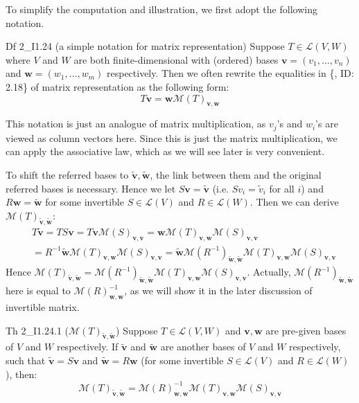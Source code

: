 \documentclass{article}
\newcommand{\basisTilde}[1]{\tilde{\pmb{#1}}}
\begin{document}
To simplify the computation and illustration, we first adopt the following notation.
\begin{Df}{Df 2\_I1.24 (a simple notation for matrix representation)}
    Suppose $T\in\mathcal{L}(V, W)$ where $V$ and $W$ are both finite-dimensional with (ordered) bases $\pmb{v} = (v_1, \dots, v_n)$ and $\pmb{w} = (w_1, \dots, w_m)$ respectively. Then we often rewrite the equalities in \{, ID: 2.18\} of matrix representation as the following form:
    $$ T\pmb{v} = \pmb{w}\mathcal{M}(T)_{\pmb{v}, \pmb{w}} $$
\end{Df}
This notation is just an analogue of matrix multiplication, as $v_j$'s and $w_i$'s are viewed as column vectors here. Since this is just the matrix multiplication, we can apply the associative law, which as we will see later is very convenient.

To shift the referred bases to $\basisTilde{v}, \basisTilde{w}$, the link between them and the original referred bases is necessary. Hence we let $S\pmb{v} = \basisTilde{v}$ \textcolor{Df}{(i.e. $Sv_i = \tilde{v}_i$ for all $i$)} and $R\pmb{w} = \basisTilde{w}$ for some invertible $S\in\mathcal{L}(V)$ and $R\in\mathcal{L}(W)$. Then we can derive $\mathcal{M}(T)_{\basisTilde{v}, \basisTilde{w}}$:
$$
\begin{aligned}
    & T\basisTilde{v} = TS\pmb{v} = T\pmb{v}\mathcal{M}(S)_{\pmb{v}, \pmb{v}} = \pmb{w}\mathcal{M}(T)_{\pmb{v}, \pmb{w}}\mathcal{M}(S)_{\pmb{v}, \pmb{v}} \\
    &= R^{-1}\basisTilde{w}\mathcal{M}(T)_{\pmb{v}, \pmb{w}}\mathcal{M}(S)_{\pmb{v}, \pmb{v}} = \basisTilde{w}\mathcal{M}(R^{-1})_{\basisTilde{w}, \basisTilde{w}}\mathcal{M}(T)_{\pmb{v}, \pmb{w}}\mathcal{M}(S)_{\pmb{v}, \pmb{v}}
\end{aligned}
$$
Hence $\mathcal{M}(T)_{\basisTilde{v}, \basisTilde{w}} = \mathcal{M}(R^{-1})_{\basisTilde{w}, \basisTilde{w}}\mathcal{M}(T)_{\pmb{v}, \pmb{w}}\mathcal{M}(S)_{\pmb{v}, \pmb{v}}$. Actually, $\mathcal{M}(R^{-1})_{\basisTilde{w}, \basisTilde{w}}$ here is equal to $\mathcal{M}(R)^{-1}_{\pmb{w}, \pmb{w}}$, as we will show it in the later discussion of invertible matrix.

\begin{Th}{Th 2\_I1.24.1 ($\mathcal{M}(T)_{\basisTilde{v}, \basisTilde{w}}$)}
    Suppose $T\in\mathcal{L}(V,W)$ and $\pmb{v}, \pmb{w}$ are pre-given bases of $V$ and $W$ respectively. If $\basisTilde{v}$ and $\basisTilde{w}$ are another bases of $V$ and $W$ respectively, such that $\basisTilde{v} = S\pmb{v}$ and $\basisTilde{w} = R\pmb{w}$ (for some invertible $S\in\mathcal{L}(V)$ and $R\in\mathcal{L}(W)$), then:
    $$\mathcal{M}(T)_{\basisTilde{v}, \basisTilde{w}} = \mathcal{M}(R)^{-1}_{\pmb{w}, \pmb{w}}\mathcal{M}(T)_{\pmb{v}, \pmb{w}}\mathcal{M}(S)_{\pmb{v}, \pmb{v}}$$
\end{Th}
\end{document}
